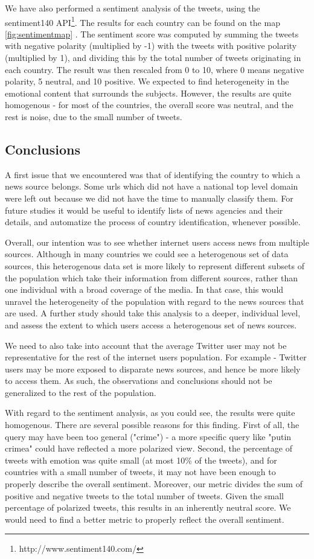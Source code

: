 \documentclass{acm_proc_10ptArticle-sp}
\begin{document}
We have also performed a sentiment analysis of the tweets, using the sentiment140 API\footnote{http://www.sentiment140.com/}. The results for each country can be found on the map \ref{fig:sentimentmap} . The sentiment score was computed by summing the tweets with negative polarity (multiplied by -1) with the tweets with positive polarity (multiplied by 1), and dividing this by the total number of tweets originating in each country. The result was then rescaled from 0 to 10, where 0 means negative polarity, 5 neutral, and 10 positive. We expected to find heterogeneity in the emotional content that surrounds the subjects. However, the results are quite homogenous - for most of the countries, the overall score was neutral, and the rest is noise, due to the small number of tweets. 

\subsection{Conclusions}

A first issue that we encountered was that of identifying the country to which a news source belongs. Some urls which did not have a national top level domain were left out because we did not have the time to manually classify them. For future studies it would be useful to identify lists of news agencies and their details, and automatize the process of country identification, whenever possible. 

Overall, our intention was to see whether internet users access news from multiple sources. Although in many countries we could see a heterogenous set of data sources, this heterogenous data set is more likely to represent different subsets of the population which take their information from different sources, rather than one individual with a broad coverage of the media. In that case, this would unravel the heterogeneity of the population with regard to the news sources that are used. A further study should take this analysis to a deeper, individual level, and assess the extent to which users access a heterogenous set of news sources. 

We need to also take into account that the average Twitter user may not be representative for the rest of the internet users population. For example - Twitter users may be more exposed to disparate news sources, and hence be more likely to access them. As such, the observations and conclusions should not be generalized to the rest of the population. 

With regard to the sentiment analysis, as you could see, the results were quite homogenous. There are several possible reasons for this finding. First of all, the query may have been too general ("crime") - a more specific query like "putin crimea" could have reflected a more polarized view. Second, the percentage of tweets with emotion was quite small (at most 10\% of the tweets), and for countries with a small number of tweets, it may not have been enough to properly describe the overall sentiment. Moreover, our metric divides the sum of positive and negative tweets to the total number of tweets. Given the small percentage of polarized tweets, this results in an inherently neutral score. We would need to find a better metric to properly reflect the overall sentiment. 
\end{document}
